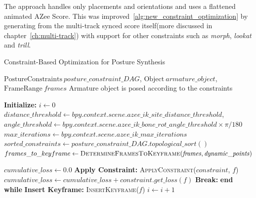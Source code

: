 \documentclass[../../main.tex]{subfiles}
\begin{document}
The approach handles only placements and orientations and uses a flattened animated AZee Score. This was improved~\ref{alg:new_constraint_optimization} by generating from the multi-track synced score itself(more discussed in chapter~\ref{ch:multi-track}) with support for other constraints such as \emph{morph}, \emph{lookat} and \emph{trill}.

\begin{algorithm}
    \caption{Constraint-Based Optimization for Posture Synthesis}
    \label{alg:trimmed_multi_track_optimization}
    \begin{algorithmic}[1]
        \Require $\text{PostureConstraints} \ \mathit{posture\_constraint\_DAG}$, $\text{Object} \ \mathit{armature\_object}$, $\text{FrameRange} \ \mathit{frames}$
        \Ensure Armature object is posed according to the constraints
        
        \State \textbf{Initialize:} $i \gets 0$
        \State $distance\_threshold \gets \mathit{bpy.context.scene.azee\_ik\_site\_distance\_threshold}$, $angle\_threshold \gets \mathit{bpy.context.scene.azee\_ik\_bone\_rot\_angle\_threshold \times \pi / 180}$
        \State $max\_iterations \gets \mathit{bpy.context.scene.azee\_ik\_max\_iterations}$
        \State $\mathit{sorted\_constraints} \gets \mathit{posture\_constraint\_DAG.topological\_sort()}$
        \State $frames\_to\_keyframe \gets \textsc{DetermineFramesToKeyframe}(\mathit{frames}, \mathit{dynamic\_points})$
        
                \State $\mathit{cumulative\_loss} \gets 0.0$
                    \State \textbf{Apply Constraint:} \textsc{ApplyConstraint}($constraint$, $f$)
                    \State $\mathit{cumulative\_loss} \gets cumulative\_loss + \mathit{constraint.get\_loss(f)}$
                \EndFor
                    \State \textbf{Break:} \textbf{end while}
                \EndIf
                \State \textbf{Insert Keyframe:} \textsc{InsertKeyframe}($f$)
            \EndFor
            \State $i \gets i + 1$
        \EndWhile
        

\end{algorithmic}
\end{algorithm}
\end{document}
